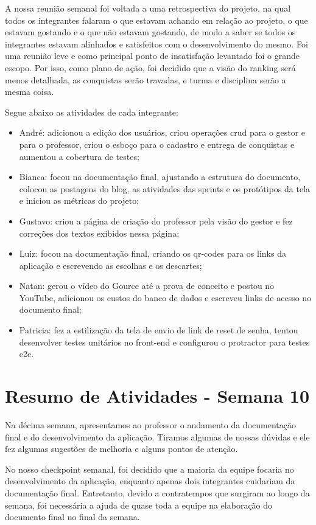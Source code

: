 \begin{apendicesenv}
A nossa reunião semanal foi voltada a uma retrospectiva do projeto, na qual todos os integrantes falaram o que estavam achando em relação ao projeto, o que estavam gostando e o que não estavam gostando, de modo a saber se todos os integrantes estavam alinhados e satisfeitos com o desenvolvimento do mesmo. Foi uma reunião leve e como principal ponto de insatisfação levantado foi o grande escopo. Por isso, como plano de ação, foi decidido que a visão do \gls{ranking} será menos detalhada, as conquistas serão travadas, e turma e disciplina serão a mesma coisa.

Segue abaixo as atividades de cada integrante:

\begin{itemize}
\item André: adicionou a edição dos usuários, criou operações \ac{crud} para o gestor e para o professor, criou o esboço para o cadastro e entrega de conquistas e aumentou a cobertura de testes;
\item Bianca: focou na documentação final, ajustando a estrutura do documento, colocou as postagens do blog, as atividades das \glspl{sprint} e os protótipos da tela e iniciou as métricas do projeto;
\item Gustavo: criou a página de criação do professor pela visão do gestor e fez correções dos textos exibidos nessa página;
\item Luiz: focou na documentação final, criando os \glspl{qr-code} para os links da aplicação e escrevendo as escolhas e os descartes;
\item Natan: gerou o vídeo do Gource até a prova de conceito e postou no YouTube, adicionou os custos do banco de dados e escreveu \glspl{link} de acesso no documento final;
\item Patricia: fez a estilização da tela de envio de \gls{link} de \gls{reset} de senha, tentou desenvolver testes unitários no front-end e configurou o protractor para testes e2e.
\end{itemize}

\section{Resumo de Atividades - Semana 10}
Na décima semana, apresentamos ao professor o andamento da documentação final e do desenvolvimento da aplicação. Tiramos algumas de nossas dúvidas e ele fez algumas sugestões de melhoria e alguns pontos de atenção.

No nosso checkpoint semanal, foi decidido que a maioria da equipe focaria no desenvolvimento da aplicação, enquanto apenas dois integrantes cuidariam da documentação final. Entretanto, devido a contratempos que surgiram ao longo da semana, foi necessária a ajuda de quase toda a equipe na elaboração do documento final no final da semana.


\end{apendicesenv}
